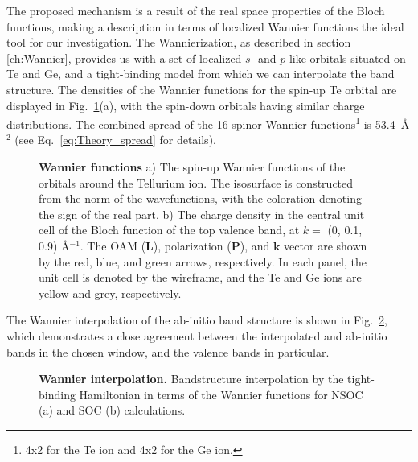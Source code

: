 The proposed mechanism is a result of the real space properties of the Bloch functions, making a description in terms of localized Wannier functions the ideal tool for our investigation.
The Wannierization, as described in section \ref{ch:Wannier}, provides us with a set of localized $s$- and $p$-like orbitals situated on Te and Ge, and a tight-binding model from which we can interpolate the band structure.
The densities of the Wannier functions for the spin-up Te orbital are displayed in Fig.~\ref{fig:Rashba_wannierfunctions}(a), with the spin-down orbitals having similar charge distributions.
The combined spread of the 16 spinor Wannier functions\footnote{4x2 for the Te ion and 4x2 for the Ge ion.} is 53.4~\AA$^2$ (see Eq.~\eqref{eq:Theory_spread} for details).
\begin{figure}
\caption{\label{fig:Rashba_wannierfunctions}{\bf Wannier functions} a) The spin-up Wannier functions of the orbitals around the Tellurium ion. The isosurface is constructed from the norm of the wavefunctions, with the coloration denoting the sign of the real part. b) The charge density in the central unit cell of the Bloch function of the top valence band, at $k=$ (0, 0.1, 0.9) \AA$^{-1}$. The OAM ($\bm L$), polarization ($\bm P$), and $\bm k$ vector are shown by the red, blue, and green arrows, respectively. In each panel, the unit cell is denoted by the wireframe, and the Te and Ge ions are yellow and grey, respectively.}
\end{figure}
The Wannier interpolation of the ab-initio band structure is shown in Fig.~\ref{fig:Rashba_wannierization}, which demonstrates a close agreement between the interpolated and ab-initio bands in the chosen window, and the valence bands in particular. 
\begin{figure}
\caption{\label{fig:Rashba_wannierization}{\bf Wannier interpolation.} Bandstructure interpolation by the tight-binding Hamiltonian in terms of the Wannier functions for NSOC (a) and SOC (b) calculations.}
\end{figure}
    

